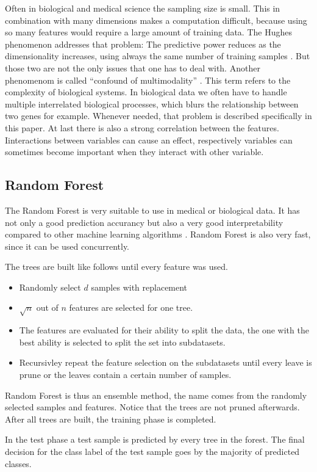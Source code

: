 \documentclass{sig-alternate-05-2015}
\begin{document}
Often in biological and medical science the sampling size is small. This in combination with many dimensions makes a computation difficult, because using so many features would require a large amount of training data. The Hughes phenomenon addresses that problem: The predictive power reduces as the dimensionality increases, using always the same number of training samples \cite{1054102}.
But those two are not the only issues that one has to deal with. Another phenomenom is called ``confound of multimodality'' \cite{clarke2008properties}. This term refers to the complexity of biological systems. In biological data we often have to handle multiple interrelated biological processes, which blurs the relationship between two genes for example. Whenever needed, that problem is described specifically in this paper.
At last there is also a strong correlation between the features. Iinteractions between variables can cause an effect, respectively variables can sometimes become important when they interact with other variable.

\subsection{Random Forest}
The Random Forest is very suitable to use in medical or biological data. It has not only a good prediction accurancy but also a very good interpretability compared to other machine learning algorithms \cite{qi2012random}. Random Forest is also very fast, since it can be used concurrently.

The trees are built like follows until every feature was used.
\begin{itemize}
\item Randomly select $d$ samples with replacement
\item $ \sqrt{n}$ out of $n$ features are selected for one tree.
\item The features are evaluated for their ability to split the data, the one with the best ability is selected to split the set into subdatasets.
\item Recursivley repeat the feature selection on the subdatasets until every leave is prune or the leaves contain a certain number of samples.
\end{itemize}
Random Forest is thus an ensemble method, the name comes from the randomly selected samples and features. Notice that the trees are not pruned afterwards.  After all trees are built, the training phase is completed.

In the test phase a test sample is predicted by every tree in the forest. The final decision for the class label of the test sample goes by the majority of predicted classes.
\end{document}
